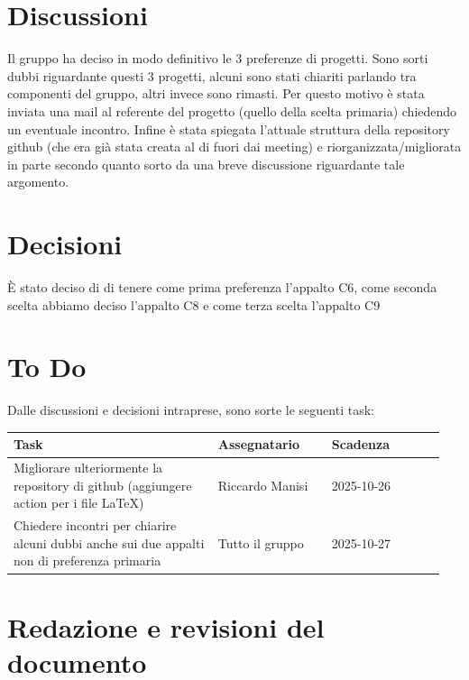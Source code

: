 \documentclass[a4paper,12pt]{article}
\begin{document}
\section{Discussioni}
Il gruppo ha deciso in modo definitivo le 3 preferenze di progetti. Sono sorti dubbi riguardante questi 3 progetti, alcuni sono stati chiariti parlando tra componenti del gruppo, altri invece sono rimasti. Per questo motivo è stata inviata una mail al referente del progetto (quello della scelta primaria) chiedendo un eventuale incontro. Infine è stata spiegata l'attuale struttura della repository github (che era già stata creata al di fuori dai meeting) e riorganizzata/migliorata in parte secondo quanto sorto da una breve discussione riguardante tale argomento.

\section{Decisioni}
È stato deciso di di tenere come prima preferenza l'appalto C6, come seconda scelta abbiamo deciso l'appalto C8 e come terza scelta l'appalto C9

\section{To Do}
Dalle discussioni e decisioni intraprese, sono sorte le seguenti task:

\begin{center}
\small
\renewcommand{\arraystretch}{1.2} 
\begin{tabular}{|p{0.45\linewidth}|p{0.25\linewidth}|p{0.25\linewidth}|}
\hline
\rowcolor{gray!60} 
\textbf{Task} & \textbf{Assegnatario} & \textbf{Scadenza} \\
\hline
\rowcolor{white}
Migliorare ulteriormente la repository di github (aggiungere action per i file LaTeX) & Riccardo Manisi & 2025-10-26 \\
\hline
\rowcolor{white}
Chiedere incontri per chiarire alcuni dubbi anche sui due appalti non di preferenza primaria & Tutto il gruppo & 2025-10-27 \\
\hline
\end{tabular}
\end{center}

\clearpage
\section{Redazione e revisioni del documento}
\end{document}
